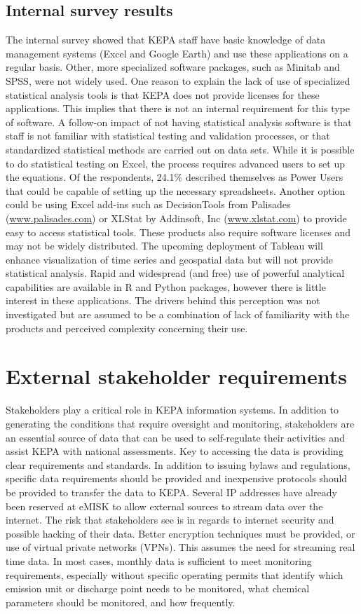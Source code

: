 \subsection{Internal survey results}
The internal survey showed that KEPA staff have basic knowledge of data management systems (Excel and Google Earth) and use these applications on a regular basis. Other, more specialized software packages, such as Minitab and SPSS, were not widely used. One reason to explain the lack of use of specialized statistical analysis tools is that KEPA does not provide licenses for these applications. This implies that there is not an internal requirement for this type of software. A follow-on impact of not having statistical analysis software is that staff is not familiar with statistical testing and validation processes, or that standardized statistical methods are carried out on data sets. While it is possible to do statistical testing on Excel, the process requires advanced users to set up the equations. Of the respondents, 24.1\% described themselves as Power Users that could be capable of setting up the necessary spreadsheets. Another option could be using Excel add-ins such as DecisionTools from Palisades (\url{www.palisades.com}) or XLStat by Addinsoft, Inc (\url{www.xlstat.com}) to provide easy to access statistical tools.  These products also require software licenses and may not be widely distributed. The upcoming deployment of Tableau will enhance visualization of time series and geospatial data but will not provide statistical analysis. Rapid and widespread (and free) use of powerful analytical capabilities are available in R and Python packages, however there is little interest in these applications. The drivers behind this perception was not investigated but are assumed to be a combination of lack of familiarity with the products and perceived complexity concerning their use. 

\section{External stakeholder requirements}

Stakeholders play a critical role in KEPA information systems. In addition to generating the conditions that require oversight and monitoring, stakeholders are an essential source of data that can be used to self-regulate their activities and assist KEPA with national assessments. Key to accessing the data is providing clear requirements and standards. In addition to issuing bylaws and regulations, specific data requirements should be provided and inexpensive protocols should be provided to transfer the data to KEPA. Several IP addresses have already been reserved at eMISK to allow external sources to stream data over the internet. The risk that stakeholders see is in regards to internet security and possible hacking of their data. Better encryption techniques must be provided, or use of virtual private networks (VPNs). This assumes the need for streaming real time data. In most cases, monthly data is sufficient to meet monitoring requirements, especially without specific operating permits that identify which emission unit or discharge point needs to be monitored, what chemical parameters should be monitored, and how frequently.


